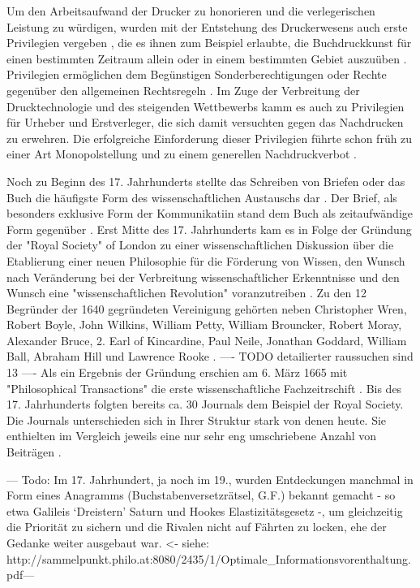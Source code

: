 Um den Arbeitsaufwand der Drucker zu honorieren und die verlegerischen Leistung zu würdigen\cite{szilagyi_2011_leistungsschutzrecht}, wurden mit der Entstehung des Druckerwesens auch erste Privilegien vergeben \cite{gieseke_1995_privileg}, die es ihnen zum Beispiel erlaubte, die Buchdruckkunst für einen bestimmten Zeitraum allein oder in einem bestimmten Gebiet auszuüben \cite{martin2008publizistische} \cite{koller_1995_Urheberrecht}. Privilegien ermöglichen dem Begünstigen Sonderberechtigungen oder Rechte gegenüber den allgemeinen Rechtsregeln \cite{jänich_2002_geistiges}. Im Zuge der Verbreitung der Drucktechnologie und des steigenden Wettbewerbs kamm es auch zu Privilegien für Urheber und Erstverleger, die sich damit versuchten gegen das Nachdrucken zu erwehren. Die erfolgreiche Einforderung dieser Privilegien führte schon früh zu einer Art Monopolstellung  und zu einem generellen Nachdruckverbot \cite{szilagyi_2011_leistungsschutzrecht}.

Noch zu Beginn des 17. Jahrhunderts stellte das Schreiben von Briefen oder das Buch die häufigste Form des wissenschaftlichen Austauschs dar \cite{porter_1964_scientific}. Der Brief, als besonders exklusive Form der Kommunikatiin stand dem Buch als zeitaufwändige Form gegenüber \cite{fecher_hiig_2014}. Erst Mitte des 17. Jahrhunderts kam es in Folge der Gründung der "Royal Society" of London zu einer wissenschaftlichen Diskussion über die Etablierung einer neuen Philosophie für die Förderung von Wissen, den Wunsch nach Veränderung bei der Verbreitung wissenschaftlicher Erkenntnisse und den Wunsch eine "wissenschaftlichen Revolution" voranzutreiben \cite{Dear_1985}. Zu den 12 Begründer der 1640 gegründeten Vereinigung gehörten neben Christopher Wren, Robert Boyle, John Wilkins, William Petty, William Brouncker, Robert Moray, Alexander Bruce, 2. Earl of Kincardine, Paul Neile, Jonathan Goddard, William Ball, Abraham Hill und Lawrence Rooke \cite{suchen}. ---- TODO detailierter raussuchen sind 13 ---- Als ein Ergebnis der Gründung erschien am 6. März 1665 mit "Philosophical Transactions" die erste wissenschaftliche Fachzeitrschift \cite{suchen}. Bis des 17. Jahrhunderts folgten bereits ca. 30 Journals dem Beispiel der Royal Society. Die Journals unterschieden sich in Ihrer Struktur stark von denen heute. Sie enthielten im Vergleich jeweils eine nur sehr eng umschriebene Anzahl von Beiträgen \cite{suchen}.

--- Todo: Im 17. Jahrhundert, ja noch im 19., wurden Entdeckungen manchmal in Form eines Anagramms (Buchstabenversetzrätsel, G.F.) bekannt gemacht - so etwa Galileis ‘Dreistern’ Saturn und Hookes Elastizitätsgesetz -, um gleichzeitig die Priorität zu sichern und die Rivalen nicht auf Fährten zu locken, ehe der Gedanke weiter ausgebaut war. <- siehe: http://sammelpunkt.philo.at:8080/2435/1/Optimale_Informationsvorenthaltung.pdf---


